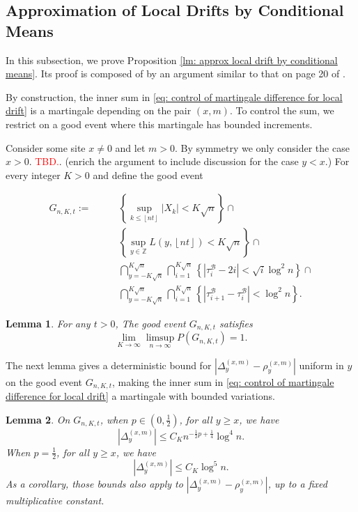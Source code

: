 \documentclass[twoside,12pt,a4paper]{article}
\newtheorem{lemma}{Lemma}[section]
\numberwithin{equation}{section}
\newcommand\TBD{\textcolor{red}{TBD.}}
\begin{document}
\subsection{Approximation of Local Drifts by Conditional Means}
In this subsection, we prove Proposition \ref{lm: approx local drift by conditional means}. Its proof is composed of by an argument similar to that on page 20 of \cite{KP16}.

By construction, the inner sum in \eqref{eq: control of martingale difference for local drift} is a martingale depending on the pair  $(x,m)$. To control the sum, we restrict on a good event where this martingale has bounded increments. 

Consider some site $x \neq 0$ and let $m > 0$. By symmetry we only consider the case $x >  0$. \TBD. (enrich the argument to include discussion for the case $y < x$.) 
For every integer $K>0$ and define the good event

\begin{align}
	G_{n,K,t} :=  \qquad
		\label{eqn:good-event-1}
		& \left\{\sup _{k \le \left\lfloor nt  \right\rfloor} |X_k| < K \sqrt{n} \right\} \cap \\
		\label{eqn:good-event-2}
		& \left\{\sup_{y \in \mathbb{Z}} L(y, \left\lfloor nt  \right\rfloor) < K \sqrt{n} \right\} \cap \\
		\label{eqn:good-event-3}
		& \bigcap_{y = - K \sqrt{n} }^{K \sqrt{n}} 
		\bigcap_{i = 1}^{K \sqrt{n} } \left\{\left| \tau_i^{\mathcal{B}} - 2 i \right| < \sqrt{ i } \log^2 n \right\}  \cap \\
		\label{eqn:good-event-4}
		& \bigcap_{y = - K \sqrt{n} }^{K \sqrt{n}} 
		\bigcap_{i = 1}^{K \sqrt{n} } \left\{\left| \tau_{i+1}^{\mathcal{B}} - \tau_i^{\mathcal{B}} \right| < \log^2 n \right\}  
.\end{align}

\begin{lemma}
	\label{lem:good-event}
	For any $t > 0$, The good event $G_{n,K,t}$ satisfies
	\[
		\lim_{K \to \infty } \limsup_{n \to \infty } 
		P(G_{n, K,t}) = 1
	.\] 
\end{lemma}


The next lemma gives a deterministic bound for $|\Delta_y^{(x,m)} - \rho_y^{(x,m)}|$ uniform in $y$ on the good event $G_{n,K,t}$, making the inner sum in \eqref{eq: control of martingale difference for local drift} a martingale with bounded variations.

\begin{lemma}\label{lm:lipchitz-bound-on-good-event}
	On $G_{n, K, t}$, when $p \in (0,\frac{1}{2})$, for all  $y \ge x$, we have
	\[
		\left| \Delta_y^{(x,m)} \right| \le C_K n^{-\frac{1}{2}p + \frac{1}{4}} \log^4 n
	.\] 
	When $p = \frac{1}{2}$, for all $y \ge x$, we have
\[
		\left| \Delta_y^{(x,m)} \right| \le C_K \log^5 n
	.\]
	As a corollary, those bounds also apply to $\left| \Delta_y^{(x,m)} - \rho_y^{(x,m)} \right| $, up to a fixed multiplicative constant.
\end{lemma}
\end{document}
